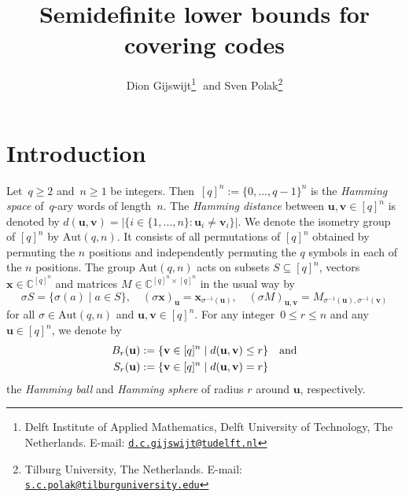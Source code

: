 \documentclass[10pt,a4paper]{article}
\newcommand{\C}{\mathbb{C}}
\theoremstyle{definition}
\newcommand{\xx}{\mathbf{x}}
\newcommand{\uu}{\mathbf{u}}
\newcommand{\vv}{\mathbf{v}}
\newcommand{\Aut}{\mathrm{Aut}}
\begin{document}
\title{Semidefinite lower bounds for covering codes}
\author{Dion Gijswijt\thanks{Delft Institute of Applied Mathematics, Delft University of Technology, The Netherlands. E-mail: \href{d.c.gijswijt@tudelft.nl}{\texttt{d.c.gijswijt@tudelft.nl}}}\,\, and Sven Polak\thanks{Tilburg University, The Netherlands. E-mail: \href{s.c.polak@tilburguniversity.edu}{\texttt{s.c.polak@tilburguniversity.edu}}}}
\maketitle 






\section{Introduction}
 Let~$q \geq 2$ and~$n\geq 1$ be integers. Then~$[q]^n := \{0,\ldots,q-1\}^n$ is the \emph{Hamming space} of~$q$-ary words of length~$n$. The \emph{Hamming distance} between $\uu,\vv\in [q]^n$ is denoted by $d(\uu,\vv)=|\{i\in\{1,\ldots,n\}: \uu_i\neq \vv_i\}|$. We denote the isometry group of $[q]^n$ by $\Aut(q,n)$. It consists of all permutations of $[q]^n$ obtained by permuting the $n$ positions and independently permuting the $q$ symbols in each of the $n$ positions. The group $\Aut(q,n)$ acts on subsets $S\subseteq [q]^n$, vectors $\xx \in\C^{[q]^n}$ and matrices $M\in \C^{[q]^n\times [q]^n}$ in the usual way by
\[
\sigma S=\{\sigma(a)\mid a\in S\},\quad (\sigma \xx)_{\uu}=\xx_{\sigma^{-1}(\uu)}, \quad (\sigma M)_{\uu,\vv}=M_{\sigma^{-1}(\uu),\sigma^{-1}(\vv)}
\]
for all $\sigma\in \Aut(q,n)$ and $\uu, \vv \in [q]^n$. For any integer~$0\leq r\leq n$ and any $\uu\in[q]^n$, we denote by 
\begin{align*}
B_r(\uu)&:=\{\vv\in [q]^n \mid d(\uu,\vv)\leq r\}\quad\text{and}\\
S_r(\uu)&:=\{\vv\in [q]^n \mid d(\uu,\vv)=r\} \notag 
\end{align*}
the \emph{Hamming ball} and \emph{Hamming sphere} of radius $r$ around $\uu$, respectively.
\end{document}
